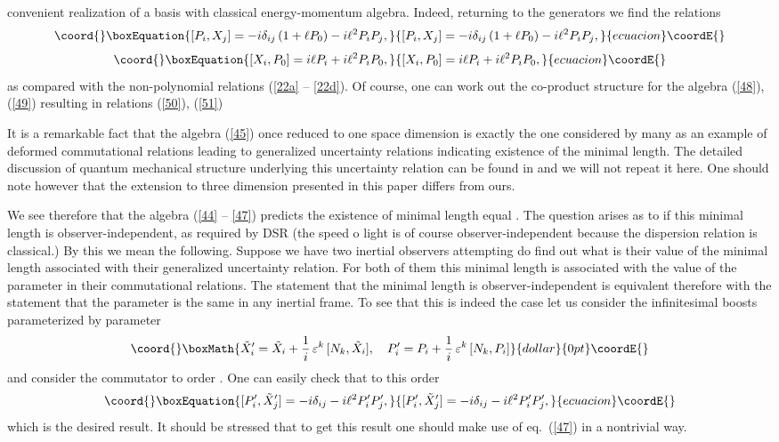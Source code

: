 \documentclass [prd,twocolumn,nofootinbib,showpacs]  {revtex4}
\begin{document}
convenient realization of a basis with classical  energy-momentum
algebra. Indeed, returning to the generators \coordHE{} we find the relations
\begin{equation}\coord{}\boxEquation{\label{50}
 [P_i, {X}_j] = - i \delta_{ij}\left(1 + \ell P_0\right) - i \ell^2 P_i P_j,
}{[P_i, {X}_j] = - i \delta_{ij}\left(1 + \ell P_0\right) - i \ell^2 P_i P_j,
}{ecuacion}\coordE{}\end{equation}
\begin{equation}\coord{}\boxEquation{\label{51}
  [{X}_i, P_0] =  i\ell P_i + i \ell^2 P_i P_0,
}{[{X}_i, P_0] =  i\ell P_i + i \ell^2 P_i P_0,
}{ecuacion}\coordE{}\end{equation}
as compared with the non-polynomial relations (\ref{22a} --
\ref{22d}). Of course, one can work out the  co-product structure
for the algebra (\ref{48}), (\ref{49}) resulting in relations
(\ref{50}), (\ref{51})

It is a remarkable fact that the algebra (\ref{45}) once reduced
to one space dimension is exactly the  one considered by many as
an example of deformed commutational relations leading to
generalized uncertainty relations indicating existence of the
minimal length. The detailed discussion of quantum mechanical
structure underlying this uncertainty relation can be found in
\cite{kmm} and we will not repeat it here. One should note however
that the extension to three dimension  presented in this paper
differs from ours.

We see therefore that the algebra (\ref{44} -- \ref{47}) predicts
the existence of minimal  length equal \myHighlight{$\ell$}\coordHE{}.  The question
arises as to if this minimal length is  observer-independent, as
required by DSR (the speed o light is of course
observer-independent because the dispersion relation is
classical.) By this we mean the following. Suppose we have two
inertial observers attempting do find out what is their value of
the minimal length associated with their generalized uncertainty
relation. For both of them this minimal length is associated with
the value of the parameter \myHighlight{$\ell$}\coordHE{} in their commutational
relations. The statement that the minimal length is
observer-independent is equivalent therefore with the statement
that the parameter \myHighlight{$\ell$}\coordHE{} is the same in any inertial frame. To
see that this is indeed the case let us consider the infinitesimal
boosts parameterized by parameter \coordHE{}  $$\coord{}\boxMath{
\tilde{X}_i' = \tilde{X}_i + \frac1i\,\varepsilon^k\, [N_k,
\tilde{X}_i], \quad P_i' = P_i +  \frac1i\,\varepsilon^k\, [N_k,
P_i]
}{dollar}{0pt}\coordE{}$$
and consider the commutator \myHighlight{$[P'_i, \tilde{X}_j']$}\coordHE{} to order \myHighlight{$\varepsilon$}\coordHE{}.
One can easily check that to this order
\begin{equation}\coord{}\boxEquation{\label{52}
 [P'_i, \tilde{X}_j'] = - i \delta_{ij} - i \ell^2 P'_i P'_j,
}{[P'_i, \tilde{X}_j'] = - i \delta_{ij} - i \ell^2 P'_i P'_j,
}{ecuacion}\coordE{}\end{equation}
which is the desired result. It should be stressed that to get
this result one should make use of  eq.~(\ref{47}) in a nontrivial
way.
\end{document}
